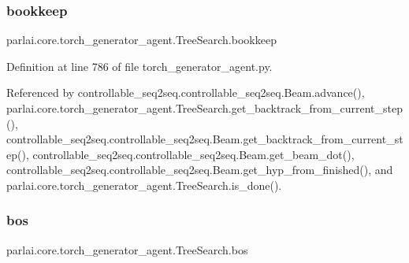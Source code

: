\mbox{\label{classparlai_1_1core_1_1torch__generator__agent_1_1TreeSearch_a1f1f3da5f6079f5043d28e72b2a6fdfa}} 
\subsubsection{\texorpdfstring{bookkeep}{bookkeep}}
{\footnotesize\ttfamily parlai.\+core.\+torch\+\_\+generator\+\_\+agent.\+Tree\+Search.\+bookkeep}



Definition at line 786 of file torch\+\_\+generator\+\_\+agent.\+py.



Referenced by controllable\+\_\+seq2seq.\+controllable\+\_\+seq2seq.\+Beam.\+advance(), parlai.\+core.\+torch\+\_\+generator\+\_\+agent.\+Tree\+Search.\+get\+\_\+backtrack\+\_\+from\+\_\+current\+\_\+step(), controllable\+\_\+seq2seq.\+controllable\+\_\+seq2seq.\+Beam.\+get\+\_\+backtrack\+\_\+from\+\_\+current\+\_\+step(), controllable\+\_\+seq2seq.\+controllable\+\_\+seq2seq.\+Beam.\+get\+\_\+beam\+\_\+dot(), controllable\+\_\+seq2seq.\+controllable\+\_\+seq2seq.\+Beam.\+get\+\_\+hyp\+\_\+from\+\_\+finished(), and parlai.\+core.\+torch\+\_\+generator\+\_\+agent.\+Tree\+Search.\+is\+\_\+done().

\mbox{\label{classparlai_1_1core_1_1torch__generator__agent_1_1TreeSearch_aaef8214c017d387336317a37f395df3c}} 
\subsubsection{\texorpdfstring{bos}{bos}}
{\footnotesize\ttfamily parlai.\+core.\+torch\+\_\+generator\+\_\+agent.\+Tree\+Search.\+bos}



